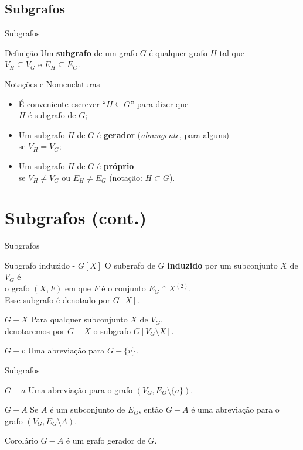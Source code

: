 \documentclass[xcolor=dvipsnames,table]{beamer}
\begin{document}
	\subsection{Subgrafos}
	\begin{frame}{Subgrafos}
		\begin{block}{Definição}
			Um {\bf subgrafo} de um grafo $G$ é qualquer grafo $H$ tal que \\$V_H \subseteq V_G$ e $E_H \subseteq E_G$.
		\end{block}  
		\begin{block}{Notações e Nomenclaturas}
			\begin{itemize}
				\item É conveniente escrever ``$H \subseteq G$'' para dizer que \\$H$ é subgrafo de $G$;  
				\item Um subgrafo $H$ de $G$ é {\bf gerador} ({\it abrangente}, para alguns) \\se $V_H = V_G$;  
				\item Um subgrafo $H$ de $G$ é {\bf próprio} \\se $V_H \not= V_G$ ou $E_H \not= E_G$ (notação: $H \subset G$).
			\end{itemize}
		\end{block}
	\end{frame}
	
	\section{Subgrafos (cont.)}
	\begin{frame}{Subgrafos}
		\begin{block}{Subgrafo induzido - $G[X]$}
			O subgrafo de $G$ {\bf induzido} por um subconjunto $X$ de $V_G$ é \\o grafo $(X, F)$ em que $F$ é o conjunto $E_G \cap X^{(2)}$. \\Esse subgrafo é denotado por $G[X]$.
		\end{block} \pause
		\begin{block}{$G - X$}
			Para qualquer subconjunto $X$ de $V_G$, \\denotaremos por $G - X$ o subgrafo $G[V_G \setminus X]$.
		\end{block} \pause
		\begin{block}{$G - v$}
			Uma abreviação para $G - \{ v \}$.
		\end{block}
	\end{frame}
	
	\begin{frame}{Subgrafos}
		\begin{block}{$G - a$}
			Uma abreviação para o grafo $(V_G, E_G \setminus \{ a \})$.
		\end{block} \pause
		\begin{block}{$G - A$}
			Se $A$ é um subconjunto de $E_G$, então $G - A$ é uma abreviação para o grafo $(V_G, E_G \setminus A)$.
		\end{block} \pause
		\begin{block}{Corolário}
			$G - A$ é um grafo gerador de $G$.
		\end{block}
	\end{frame}
\end{document}

